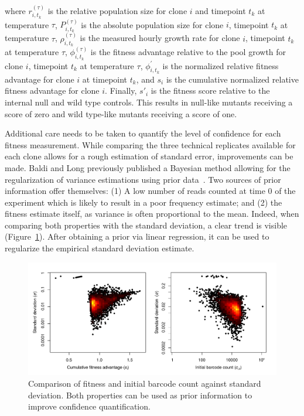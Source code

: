 where $r_{i,t_k}^{(\tau)}$ is the relative population size for clone $i$ and timepoint $t_k$ at temperature $\tau$, $P_{i,t_k}^{(\tau)}$ is the absolute population size for clone $i$, timepoint $t_k$ at temperature $\tau$, $\rho_{i,t_k}^{(\tau)}$ is the measured hourly growth rate for clone $i$, timepoint $t_k$ at temperature $\tau$, $\phi_{i,t_k}^{(\tau)}$ is the fitness advantage relative to the pool growth for clone $i$, timepoint $t_k$ at temperature $\tau$, $\phi_{i,t_k}^\prime$ is the normalized relative fitness advantage for clone $i$ at timepoint $t_k$, and $s_i$ is the cumulative normalized relative fitness advantage for clone $i$. Finally, $s'_i$ is the fitness score relative to the internal null and wild type controls. This results in null-like mutants receiving a score of zero and wild type-like mutants receiving a score of one.

Additional care needs to be taken to quantify the level of confidence for each fitness measurement. While comparing the three technical replicates available for each clone allows for a rough estimation of standard error, improvements can be made. Baldi and Long previously published a Bayesian method allowing for the regularization of variance estimations using prior data~\cite{baldi_bayesian_2001}. Two sources of prior information offer themselves: (1) A low number of reads counted at time 0 of the experiment which is likely to result in a poor frequency estimate; and (2) the fitness estimate itself, as variance is often proportional to the mean. Indeed, when comparing both properties with the standard deviation, a clear trend is visible (Figure~\ref{fig:baldiLong}). After obtaining a prior via linear regression, it can be used to regularize the empirical standard deviation estimate.

\begin{figure}[h!]
	\centering
	\includegraphics[width=\textwidth]{img/baldi_long.pdf}
	\caption{Comparison of fitness and initial barcode count against standard deviation. Both properties can be used as prior information to improve confidence quantification.}
	\label{fig:baldiLong}
\end{figure}


